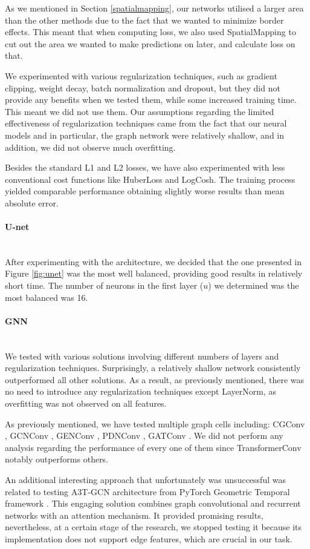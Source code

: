 As we mentioned in Section \ref{spatialmapping}, our networks utilised a larger area than the other methods due to the fact that we wanted to minimize border effects. This meant that when computing loss, we also used SpatialMapping to cut out the area we wanted to make predictions on later, and calculate loss on that.

We experimented with various regularization techniques, such as gradient clipping, weight decay, batch normalization and dropout, but they did not provide any benefits when we tested them, while some increased training time. This meant we did not use them. Our assumptions regarding the limited effectiveness of regularization techniques came from the fact that our neural models and in particular, the graph network were relatively shallow, and in addition, we did not observe much overfitting.

Besides the standard L1 and L2 losses, we have also experimented with less conventional cost functions like HuberLoss and LogCosh. The training process yielded comparable performance obtaining slightly worse results than mean absolute error.

\paragraph{U-net} \mbox{} \\
\noindent After experimenting with the architecture, we decided that the one presented in Figure \ref{fig:unet} was the most well balanced, providing good results in relatively short time. The number of neurons in the first layer ($u$) we determined was the most balanced was 16.

\paragraph{GNN} \mbox{} \\
\noindent We tested with various solutions involving different numbers of layers and regularization techniques. Surprisingly, a relatively shallow network consistently outperformed all other solutions. As a result, as previously mentioned, there was no need to introduce any regularization techniques except LayerNorm, as overfitting was not observed on all features.

As previously mentioned, we have tested multiple graph cells including: CGConv \cite{PhysRevLett.120.145301}, GCNConv \cite{kipf2017semisupervised}, GENConv \cite{li2020deepergcn}, PDNConv \cite{rozemberczki2021pathfinder}, GATConv \cite{veličković2018graph}. We did not perform any analysis regarding the performance of every one of them since TransformerConv notably outperforms others.

An additional interesting approach that unfortunately was unsuccessful was related to testing A3T-GCN architecture \cite{zhu2020a3tgcn} from PyTorch Geometric Temporal framework \cite{rozemberczki2021pytorch}. This engaging solution combines graph convolutional and recurrent networks with an attention mechanism. It provided promising results, nevertheless, at a certain stage of the research, we stopped testing it because its implementation does not support edge features, which are crucial in our task.